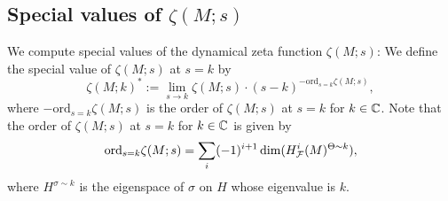 \subsection{Special values of \texorpdfstring{$\zeta(M;s)$}{}}

We compute special values of the dynamical zeta function $\zeta(M;s)$:
We define the special value of $\zeta(M;s)$ at $s=k$ by
\begin{equation*}
    \zeta(M;k)^{*}:=\lim_{s\rightarrow k}\zeta(M;s)\cdot (s-k)^{-\mathrm{ord}_{s=k}\zeta(M;s)},
\end{equation*}
where ${-\mathrm{ord}_{s=k}\zeta(M;s)}$ is the order of $\zeta(M;s)$ at $s=k$ for $k\in{\mathbb{C}}$.
Note that the order of $\zeta(M;s)$ at $s=k$ for $k\in{\mathbb{C}}$ is given by
\begin{equation*}
    \mathrm{ord}_{s=k}\zeta(M;s)=\sum_{i}(-1)^{i+1}\dim(H^{i}_{{\mathcal{F}}}(M)^{\Theta\sim k}),
\end{equation*}
where $H^{\sigma\sim{k}}$ is the eigenspace of $\sigma$ on $H$ whose eigenvalue is $k$. 


